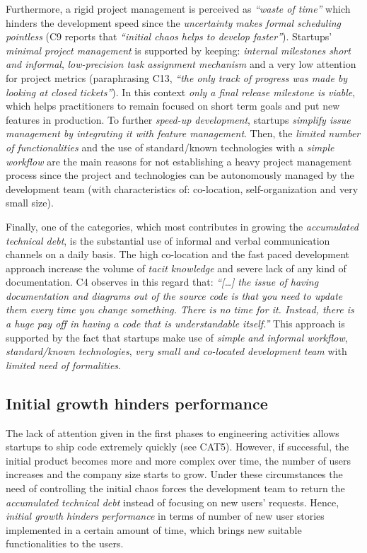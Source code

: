 \documentclass[10pt,journal,letterpaper,compsoc]{IEEEtran}
\begin{document}
Furthermore, a rigid project management is perceived as \textit{``waste of 
time''} which hinders the development speed since the \textit{uncertainty makes 
formal scheduling pointless} (C9  reports that \textit{``initial chaos helps to 
develop faster''}). Startups' \textit{minimal project management}  is supported 
by keeping: \textit{internal milestones short and informal}, 
\textit{low-precision task assignment mechanism}  and a very low attention for 
project metrics (paraphrasing C13, \textit{``the only track of progress was made 
by looking at closed tickets''}). In this context \textit{only a final release 
milestone is viable}, which helps practitioners to remain focused on short term 
goals and put new features in production. To further \textit{speed-up 
development}, startups \textit{simplify issue management by integrating it with 
feature management}. Then, the \textit{limited number of functionalities} and 
the {use of standard/known technologies} with a \textit{simple workflow} are the 
main reasons for 
not establishing a heavy project management process since the project and 
technologies can be autonomously managed by the development team (with 
characteristics of: co-location, self-organization and very small size). %

Finally, one of the categories, which most contributes in growing the 
\textit{accumulated technical debt}, is the substantial  use of informal and 
verbal communication channels on a daily basis. The high co-location and the 
fast paced development approach increase the volume of \textit{tacit knowledge} 
and severe lack of any kind of documentation.  C4 observes in this regard that:  
\textit{``[\ldots] the issue of having documentation and diagrams out of the 
source code is that you need to update them every time you change something. 
There is no time for it. Instead, there is a huge pay off in having a code that 
is understandable itself.''}
This approach is supported by the fact that startups make use of  
\textit{simple and informal workflow}, \textit{standard/known technologies}, 
\textit{very small and co-located development team} with \textit{limited need of 
formalities}.
\subsection{Initial growth hinders performance}
\label{res:gsm:cat6}
The lack of attention given in the first phases to engineering activities 
allows startups to ship code extremely quickly (see CAT5). However, if 
successful, the initial product becomes more and more complex over time, the 
number of users increases and the company size starts to grow. Under these 
circumstances the need of controlling the initial chaos forces the development 
team to return the \textit{accumulated technical debt} instead of focusing on 
new users' requests. Hence, \textit{initial growth hinders performance} in terms 
of number of new user stories implemented in a certain amount of time, which 
brings new suitable functionalities to the users.
\end{document}
